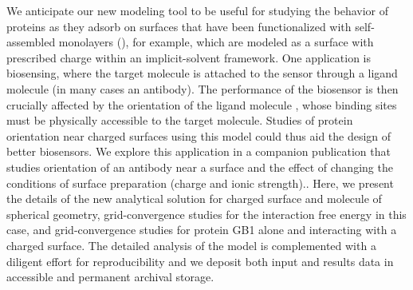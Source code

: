 We anticipate our new modeling tool to be useful for studying the behavior of proteins as they adsorb on surfaces that have been functionalized with  self-assembled monolayers (\sam), for example, which are modeled as a surface with prescribed charge within an implicit-solvent framework. 
One application is biosensing, where the target molecule is attached to the sensor through a ligand molecule (in many cases an antibody). The performance of the biosensor is then crucially affected by the orientation of the ligand molecule \cite{TajimaTakaiIshihara2011,TrillingBeekwilderZuilhof2013}, whose binding sites must be physically accessible to the target molecule. Studies of protein orientation near charged surfaces using this model could thus aid the design of better biosensors. We explore this application in a companion publication that studies orientation of an antibody near a surface and the effect of changing the conditions of surface preparation (charge and ionic strength).\cite{CooperBarba2015b}. Here, we present the details of the new analytical solution for charged surface and molecule of spherical geometry, grid-convergence studies for the interaction free energy in this case, and grid-convergence studies for protein GB1 alone and interacting with a charged surface. The detailed analysis of the model is complemented with a diligent effort for reproducibility and we deposit both input and results data in accessible and permanent archival storage.
